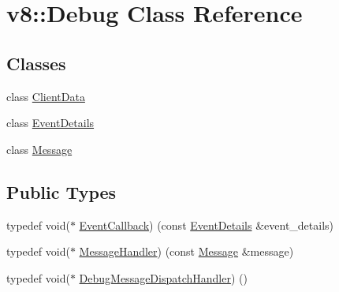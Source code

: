 \hypertarget{classv8_1_1_debug}{}\section{v8\+:\+:Debug Class Reference}
\label{classv8_1_1_debug}
\subsection*{Classes}
\begin{DoxyCompactItemize}
\item 
class \hyperlink{classv8_1_1_debug_1_1_client_data}{Client\+Data}
\item 
class \hyperlink{classv8_1_1_debug_1_1_event_details}{Event\+Details}
\item 
class \hyperlink{classv8_1_1_debug_1_1_message}{Message}
\end{DoxyCompactItemize}
\subsection*{Public Types}
\begin{DoxyCompactItemize}
\item 
typedef void($\ast$ \hyperlink{classv8_1_1_debug_ab53894746a21222796062f0e81ea28d8}{Event\+Callback}) (const \hyperlink{classv8_1_1_debug_1_1_event_details}{Event\+Details} \&event\+\_\+details)
\item 
typedef void($\ast$ \hyperlink{classv8_1_1_debug_a526826b857bd3e3efa184e12bcebc694}{Message\+Handler}) (const \hyperlink{classv8_1_1_debug_1_1_message}{Message} \&message)
\item 
typedef void($\ast$ \hyperlink{classv8_1_1_debug_a91cd8aa9743e3478bc63fe73abcd557c}{Debug\+Message\+Dispatch\+Handler}) ()
\end{DoxyCompactItemize}
